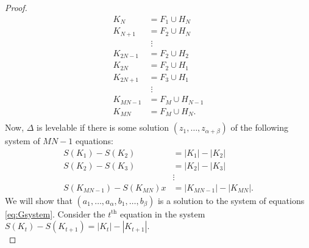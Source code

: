 \begin{proof}
\begin{equation}
\begin{aligned}
    K_N &= F_1 \cup H_N \\
    K_{N+1} &= F_2 \cup H_N \\
    & \; \vdots \\ 
    K_{2N-1} &= F_{2} \cup H_{2} \\
	K_{2N} &= F_{2} \cup H_{1} \\
    K_{2N+1} &= F_{3} \cup H_{1} \\
    & \; \vdots \\
    K_{MN-1} &= F_{M} \cup H_{N-1} \\
    K_{MN} &= F_{M} \cup H_{N}. \\
\end{aligned}
\end{equation}
Now, $\Delta$ is levelable if there is some solution $(z_1, \dots , z_{\alpha + \beta})$ of the following system of $MN - 1$ equations:
\begin{equation}
\label{eq:Gsystem}
  \begin{aligned}
	S(K_1) - S(K_2) & = |K_1| - |K_2| \\
	S(K_2) - S(K_3) & = |K_2| - |K_3| \\
	&\vdots \\
	S(K_{MN - 1}) - S(K_{MN}) x & = |K_{MN-1}| - |K_{MN}|.
  \end{aligned}
\end{equation}
We will show that $(a_1, \dots , a_\alpha,  b_1, \dots,b_\beta)$ is a solution to the system of equations \eqref{eq:Gsystem}. Consider the $t^{\textrm{th}}$ equation in the system $S(K_t) - S(K_{t+1}) = |K_t| - |K_{t+1}|$. \\


\end{proof}
